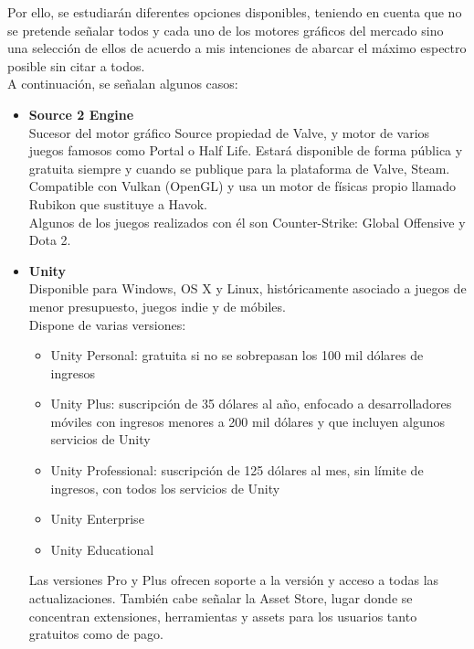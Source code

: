 \quad Por ello, se estudiarán diferentes opciones disponibles, teniendo en cuenta que no se pretende señalar todos y cada uno de los motores gráficos del mercado sino una
selección de ellos de acuerdo a mis intenciones de abarcar el máximo espectro posible sin citar a todos.\\

\quad A continuación, se señalan algunos casos:\\

\begin{itemize}
\item{\textbf{Source 2 Engine}}\\

\quad Sucesor del motor gráfico Source propiedad de Valve, y motor de varios juegos famosos como Portal o Half Life. Estará disponible de forma pública y gratuita siempre y cuando se publique para la plataforma de Valve, Steam. Compatible con Vulkan (OpenGL) y usa un motor de físicas propio llamado Rubikon que sustituye a Havok. \\

\quad Algunos de los juegos realizados con él son Counter-Strike: Global Offensive y Dota 2.\\ 

\item{\textbf{Unity}} \\

\quad Disponible para Windows, OS X y Linux, históricamente asociado a juegos de menor presupuesto, juegos indie y de móbiles.\\ 

\quad Dispone de varias versiones: 
\begin{itemize}
	\item Unity Personal: gratuita si no se sobrepasan los 100 mil dólares de ingresos
	\item Unity Plus: suscripción de 35 dólares al año, enfocado a desarrolladores móviles con ingresos menores a 200 mil dólares y que incluyen algunos servicios de Unity
	\item Unity Professional: suscripción de 125 dólares al mes, sin límite de ingresos, con todos los servicios de Unity
	\item Unity Enterprise
	\item Unity Educational 
\end{itemize}
\quad Las versiones Pro y Plus ofrecen soporte a la versión y acceso a todas las actualizaciones. También cabe señalar la Asset Store, lugar donde se concentran extensiones, herramientas y assets para los usuarios tanto gratuitos como de pago.\\


\end{itemize}

